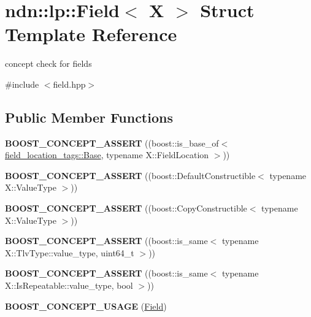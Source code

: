 \hypertarget{structndn_1_1lp_1_1Field}{}\section{ndn\+:\+:lp\+:\+:Field$<$ X $>$ Struct Template Reference}
\label{structndn_1_1lp_1_1Field}


concept check for fields  




{\ttfamily \#include $<$field.\+hpp$>$}

\subsection*{Public Member Functions}
\begin{DoxyCompactItemize}
\item 
{\bfseries B\+O\+O\+S\+T\+\_\+\+C\+O\+N\+C\+E\+P\+T\+\_\+\+A\+S\+S\+E\+RT} ((boost\+::is\+\_\+base\+\_\+of$<$ \hyperlink{classndn_1_1lp_1_1field__location__tags_1_1Base}{field\+\_\+location\+\_\+tags\+::\+Base}, typename X\+::\+Field\+Location $>$))\hypertarget{structndn_1_1lp_1_1Field_ac4f5190c68eac077159ba64790d018cb}{}\label{structndn_1_1lp_1_1Field_ac4f5190c68eac077159ba64790d018cb}

\item 
{\bfseries B\+O\+O\+S\+T\+\_\+\+C\+O\+N\+C\+E\+P\+T\+\_\+\+A\+S\+S\+E\+RT} ((boost\+::\+Default\+Constructible$<$ typename X\+::\+Value\+Type $>$))\hypertarget{structndn_1_1lp_1_1Field_a0f46083f9c4f09b515e180a350e3179b}{}\label{structndn_1_1lp_1_1Field_a0f46083f9c4f09b515e180a350e3179b}

\item 
{\bfseries B\+O\+O\+S\+T\+\_\+\+C\+O\+N\+C\+E\+P\+T\+\_\+\+A\+S\+S\+E\+RT} ((boost\+::\+Copy\+Constructible$<$ typename X\+::\+Value\+Type $>$))\hypertarget{structndn_1_1lp_1_1Field_a39fa4169255b3f95c03351ec9bffe077}{}\label{structndn_1_1lp_1_1Field_a39fa4169255b3f95c03351ec9bffe077}

\item 
{\bfseries B\+O\+O\+S\+T\+\_\+\+C\+O\+N\+C\+E\+P\+T\+\_\+\+A\+S\+S\+E\+RT} ((boost\+::is\+\_\+same$<$ typename X\+::\+Tlv\+Type\+::value\+\_\+type, uint64\+\_\+t $>$))\hypertarget{structndn_1_1lp_1_1Field_a30b8983fc049d580f444237d10ac931b}{}\label{structndn_1_1lp_1_1Field_a30b8983fc049d580f444237d10ac931b}

\item 
{\bfseries B\+O\+O\+S\+T\+\_\+\+C\+O\+N\+C\+E\+P\+T\+\_\+\+A\+S\+S\+E\+RT} ((boost\+::is\+\_\+same$<$ typename X\+::\+Is\+Repeatable\+::value\+\_\+type, bool $>$))\hypertarget{structndn_1_1lp_1_1Field_a710c1aaa15fe7809d42f381d2532cf8a}{}\label{structndn_1_1lp_1_1Field_a710c1aaa15fe7809d42f381d2532cf8a}

\item 
{\bfseries B\+O\+O\+S\+T\+\_\+\+C\+O\+N\+C\+E\+P\+T\+\_\+\+U\+S\+A\+GE} (\hyperlink{structndn_1_1lp_1_1Field}{Field})\hypertarget{structndn_1_1lp_1_1Field_afefc13a9ad7317cee6c019ddf84ec16a}{}\label{structndn_1_1lp_1_1Field_afefc13a9ad7317cee6c019ddf84ec16a}

\end{DoxyCompactItemize}


